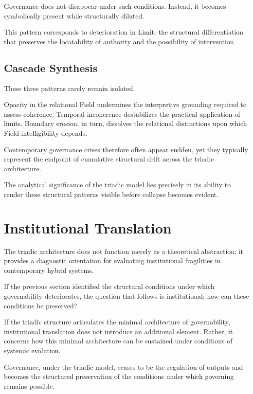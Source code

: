 \documentclass[12pt]{article}
\begin{document}
Governance does not disappear under such conditions. Instead, it becomes symbolically present while structurally diluted.

This pattern corresponds to deterioration in Limit: the structural differentiation that preserves the locatability of authority and the possibility of intervention.

\subsection{Cascade Synthesis}


These three patterns rarely remain isolated.

Opacity in the relational Field undermines the interpretive grounding required to assess coherence. Temporal incoherence destabilizes the practical application of limits. Boundary erosion, in turn, dissolves the relational distinctions upon which Field intelligibility depends.

Contemporary governance crises therefore often appear sudden, yet they typically represent the endpoint of cumulative structural drift across the triadic architecture.

The analytical significance of the triadic model lies precisely in its ability to render these structural patterns visible before collapse becomes evident.

\section{Institutional Translation}


The triadic architecture does not function merely as a theoretical abstraction; it provides a diagnostic orientation for evaluating institutional fragilities in contemporary hybrid systems.


If the previous section identified the structural conditions under which governability deteriorates, the question that follows is institutional: how can these conditions be preserved?

If the triadic structure articulates the minimal architecture of governability, institutional translation does not introduce an additional element. Rather, it concerns how this minimal architecture can be sustained under conditions of systemic evolution.

Governance, under the triadic model, ceases to be the regulation of outputs and becomes the structured preservation of the conditions under which governing remains possible.
\end{document}
